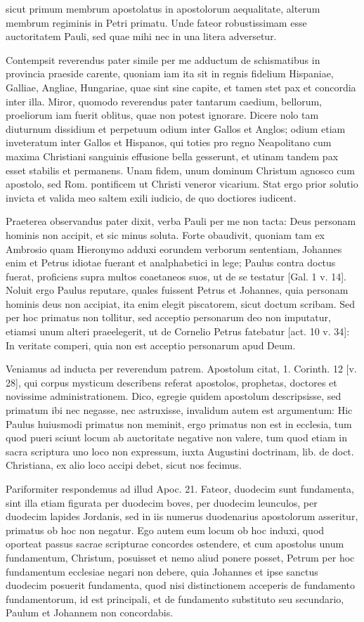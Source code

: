 sicut primum membrum apostolatus in apostolorum aequalitate, alterum membrum regiminis in Petri primatu. Unde fateor robustissimam esse auctoritatem Pauli, sed quae mihi nec in una litera adversetur.

Contempsit reverendus pater simile per me adductum de schismatibus in provincia praeside carente, quoniam iam ita sit in regnis fidelium Hispaniae, Galliae, Angliae, Hungariae, quae sint sine capite, et tamen stet pax et concordia inter illa. Miror, quomodo reverendus pater tantarum caedium, bellorum, proeliorum iam fuerit oblitus, quae non potest ignorare. Dicere nolo tam diuturnum dissidium et perpetuum odium inter Gallos et Anglos; odium etiam inveteratum inter Gallos et Hispanos, qui toties pro regno Neapolitano cum maxima Christiani sanguinis effusione bella gesserunt, et utinam tandem pax esset stabilis et permanens. Unam fidem, unum dominum Christum agnosco cum apostolo, sed Rom. pontificem ut Christi veneror vicarium. Stat ergo prior solutio invicta et valida meo saltem exili iudicio, de quo doctiores iudicent.

Praeterea observandus pater dixit, verba Pauli per me non tacta: Deus personam hominis non accipit, et sic minus soluta. Forte obaudivit, quoniam tam ex Ambrosio quam Hieronymo adduxi eorundem verborum sententiam, Johannes enim et Petrus idiotae fuerant et analphabetici in lege; Paulus contra doctus fuerat, proficiens supra multos coaetaneos suos, ut de se testatur [Gal. 1 v. 14]. Noluit ergo Paulus reputare, quales fuissent Petrus et Johannes, quia personam hominis deus non accipiat, ita enim elegit piscatorem, sicut doctum scribam. Sed per hoc primatus non tollitur, sed acceptio personarum deo non imputatur, etiamsi unum alteri praeelegerit, ut de Cornelio Petrus fatebatur [act. 10 v. 34]: In veritate comperi, quia non est acceptio personarum apud Deum.

Veniamus ad inducta per reverendum patrem. \marginpar{\small[317]} Apostolum citat, 1. Corinth. 12 [v. 28], qui corpus mysticum describens referat apostolos, prophetas, doctores et novissime administrationem. Dico, egregie quidem apostolum descripsisse, sed primatum ibi nec negasse, nec astruxisse, invalidum autem est argumentum: Hic Paulus huiusmodi primatus non meminit, ergo primatus non est in ecclesia, tum quod pueri sciunt locum ab auctoritate negative non valere, tum quod etiam in sacra scriptura uno loco non expressum, iuxta Augustini doctrinam, lib. de doct. Christiana, ex alio loco accipi debet, sicut nos fecimus.

Pariformiter respondemus ad illud Apoc. 21. Fateor, duodecim sunt fundamenta, sint illa etiam figurata per duodecim boves, per duodecim leunculos, per duodecim lapides Jordanis, sed in iis numerus duodenarius apostolorum asseritur, primatus ob hoc non negatur. Ego autem eum locum ob hoc induxi, quod oporteat passus sacrae scripturae concordes ostendere, et cum apostolus unum fundamentum, Christum, posuisset et nemo aliud ponere posset, Petrum per hoc fundamentum ecclesiae negari non debere, quia Johannes et ipse sanctus duodecim posuerit fundamenta, quod nisi distinctionem acceperis de fundamento fundamentorum, id est principali, et de fundamento substituto seu secundario, Paulum et Johannem non concordabis.


